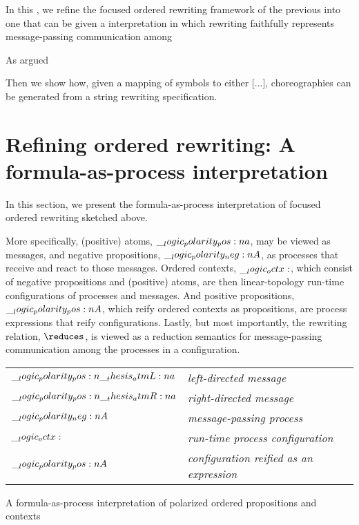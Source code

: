 In this , we refine the focused ordered rewriting framework of the previous  into one that can be given a  interpretation in which rewriting faithfully represents message-passing communication among 

As argued 

Then we show how, given a mapping of symbols to either [...], choreographies can be generated from a string rewriting specification.



\section{Refining ordered rewriting: A formula-as-process interpretation}

In this section, we present the formula-as-process interpretation of focused ordered rewriting sketched above.

More specifically,
(positive) atoms, $\__logic_polarity_pos:n {a}$, may be viewed as messages, and negative propositions, $\__logic_polarity_neg:n {A}$, as processes that receive and react to those messages.
Ordered contexts, $\__logic_octx:$, which consist of negative propositions and (positive) atoms, are then linear-topology run-time configurations of processes and messages.
And positive propositions, $\__logic_polarity_pos:n {A}$, which reify ordered contexts as propositions, are process expressions that reify configurations.
Lastly, but most importantly, the rewriting relation, $\reduces$, is viewed as a reduction semantics for message-passing communication among the processes in a configuration.%
\begin{margintable}
  \begin{center}
    \begin{tabular}{@{}l@{\enspace\ }>{\itshape}l@{}}
      $\__logic_polarity_pos:n {\__thesis_atmL:n {a}}$ & left-directed message \\
      $\__logic_polarity_pos:n {\__thesis_atmR:n {a}}$ & right-directed message \\
      $\__logic_polarity_neg:n {A}$ & message-passing process \\
      $\__logic_octx:$ & run-time process configuration \\
      $\__logic_polarity_pos:n {A}$ & configuration reified as an expression
    \end{tabular}
  \end{center}
  \caption{A formula-as-process interpretation of polarized ordered propositions and contexts}\label{fig:choreographies:propctx-table}
\end{margintable}%

